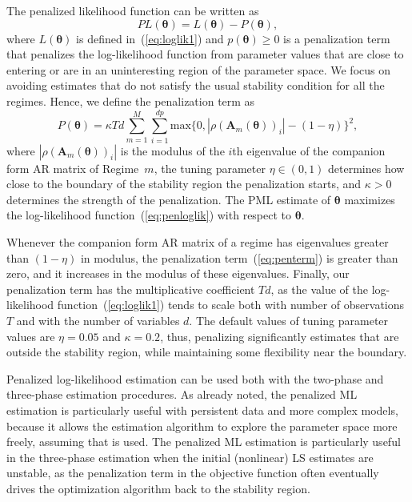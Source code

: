 \documentclass[nojss]{jss}
\begin{document}
The penalized likelihood function can be written as
\begin{equation}\label{eq:penloglik}
PL(\boldsymbol{\theta}) = L(\boldsymbol{\theta}) - P(\boldsymbol{\theta}),
\end{equation}
where $L(\boldsymbol{\theta})$ is defined in~(\ref{eq:loglik1}) and $p(\boldsymbol{\theta})\geq 0$ is a penalization term that penalizes the log-likelihood function from parameter values that are close to entering or are in an uninteresting region of the parameter space. We focus on avoiding estimates that do not satisfy the usual stability condition for all the regimes. Hence, we define the penalization term as
\begin{equation}\label{eq:penterm}
P(\boldsymbol{\theta}) = \kappa Td \sum_{m=1}^M\sum_{i=1}^{dp} \text{max}\lbrace 0, |\rho(\boldsymbol{A}_m(\boldsymbol{\theta}))_i| - (1 - \eta) \rbrace^2,
\end{equation}
where $|\rho(\boldsymbol{A}_m(\boldsymbol{\theta}))_i|$ is the modulus of the $i$th eigenvalue of the companion form AR matrix of Regime~$m$, the tuning parameter $\eta\in (0, 1)$ determines how close to the boundary of the stability region the penalization starts, and $\kappa>0$ determines the strength of the penalization. The PML estimate of $\boldsymbol{\theta}$ maximizes the log-likelihood function~(\ref{eq:penloglik}) with respect to $\boldsymbol{\theta}$.

Whenever the companion form AR matrix of a regime has eigenvalues greater than $(1 - \eta)$ in modulus, the penalization term~(\ref{eq:penterm}) is greater than zero, and it increases in the modulus of these eigenvalues. Finally, our penalization term has the multiplicative coefficient $Td$, as the value of the log-likelihood function~(\ref{eq:loglik1}) tends to scale both with number of observations $T$ and with the number of variables $d$. The default values of tuning parameter values are $\eta = 0.05$ and $\kappa = 0.2$, thus, penalizing significantly estimates that are outside the stability region, while maintaining some flexibility near the boundary.

Penalized log-likelihood estimation can be used both with the two-phase and three-phase estimation procedures. As already noted, the penalized ML estimation is particularly useful with persistent data and more complex models, because it allows the estimation algorithm to explore the parameter space more freely, assuming that  is used. The penalized ML estimation is particularly useful in the three-phase estimation when the initial (nonlinear) LS estimates are unstable, as the penalization term in the objective function often eventually drives the optimization algorithm back to the stability region.
\end{document}
